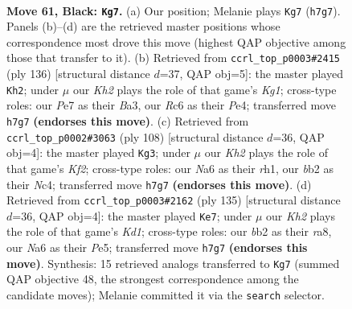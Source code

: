 \documentclass[11pt]{article}
\begin{document}
\clearpage

\begin{figure}[p]\centering
\begin{subfigure}{0.46\textwidth}\centering
\resizebox{\linewidth}{!}{%
\newchessgame
\chessboard[
  setfen={8/4p2k/npr5/pN4p1/P1p5/2P3K1/1B1R4/8 b - - 3 61},
  showmover=false,
  pgfstyle=straightmove, color=movearrow, markmove={h7-g7}
]}
\caption{}
\end{subfigure}\hfill
\begin{subfigure}{0.46\textwidth}\centering
\resizebox{\linewidth}{!}{%
\newchessgame
\chessboard[
  setfen={R7/6k1/2r1bpp1/7p/4P2P/B4P2/6P1/6K1 w - - 62 69},
  showmover=false,
  pgfstyle=straightmove, color=movearrow, markmove={g1-h2}
]}
\caption{}
\end{subfigure}
\\[4pt]
\begin{subfigure}{0.46\textwidth}\centering
\resizebox{\linewidth}{!}{%
\newchessgame
\chessboard[
  setfen={8/6k1/2n3p1/6Pp/2N1R2P/1p6/1P3K2/7r w - - 11 55},
  showmover=false,
  pgfstyle=straightmove, color=movearrow, markmove={f2-g3}
]}
\caption{}
\end{subfigure}\hfill
\begin{subfigure}{0.46\textwidth}\centering
\resizebox{\linewidth}{!}{%
\newchessgame
\chessboard[
  setfen={R2k4/2p5/5rp1/2N1p2p/1Pb1P2P/6P1/1K6/8 b - - 15 68},
  showmover=false,
  pgfstyle=straightmove, color=movearrow, markmove={d8-e7}
]}
\caption{}
\end{subfigure}
\caption{\textbf{Move 61, Black: \texttt{Kg7}.} (a) Our position; Melanie plays \texttt{Kg7} (\texttt{h7g7}). Panels (b)--(d) are the retrieved master positions whose correspondence most drove this move (highest QAP objective among those that transfer to it). (b) Retrieved from \texttt{ccrl\_top\_p0003\#2415} (ply 136) [structural distance $d$=37, QAP obj=5]: the master played \texttt{Kh2}; under $\mu$ our \emph{Kh2} plays the role of that game's \emph{Kg1}; cross-type roles: our \emph{P}e7 as their \emph{B}a3, our \emph{R}c6 as their \emph{P}e4; transferred move \texttt{h7g7} \textbf{(endorses this move)}. (c) Retrieved from \texttt{ccrl\_top\_p0002\#3063} (ply 108) [structural distance $d$=36, QAP obj=4]: the master played \texttt{Kg3}; under $\mu$ our \emph{Kh2} plays the role of that game's \emph{Kf2}; cross-type roles: our \emph{N}a6 as their \emph{r}h1, our \emph{b}b2 as their \emph{N}c4; transferred move \texttt{h7g7} \textbf{(endorses this move)}. (d) Retrieved from \texttt{ccrl\_top\_p0003\#2162} (ply 135) [structural distance $d$=36, QAP obj=4]: the master played \texttt{Ke7}; under $\mu$ our \emph{Kh2} plays the role of that game's \emph{Kd1}; cross-type roles: our \emph{b}b2 as their \emph{r}a8, our \emph{N}a6 as their \emph{P}e5; transferred move \texttt{h7g7} \textbf{(endorses this move)}. Synthesis: 15 retrieved analogs transferred to \texttt{Kg7} (summed QAP objective 48, the strongest correspondence among the candidate moves); Melanie committed it via the \texttt{search} selector.}
\label{fig:thought-m121}
\end{figure}
\end{document}
